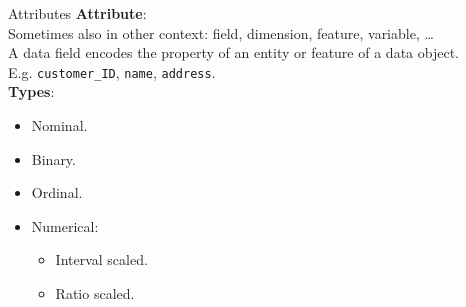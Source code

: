 \begin{frame}{Attributes}
	\textbf{Attribute}:\\
	Sometimes also in other context: field, dimension, feature, variable, \ldots\\[0.2cm]
	A data field encodes the property of an entity or feature of a data object.\\
	E.g. \texttt{customer\_ID}, \texttt{name}, \texttt{address}.\\[0.5cm]

	\textbf{Types}:
	\begin{itemize}
		\item Nominal.
		\item Binary.
		\item Ordinal.
		\item Numerical:
		      \begin{itemize}
			      \item Interval scaled.
			      \item Ratio scaled.
		      \end{itemize}
	\end{itemize}
\end{frame}

